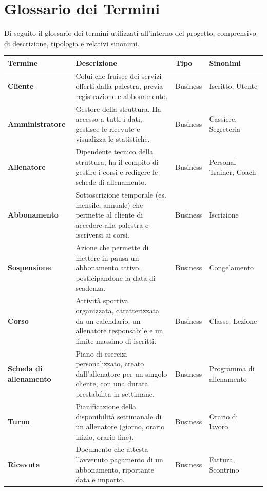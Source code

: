\documentclass[12pt,a4paper]{report}
\begin{document}
\chapter{Glossario dei Termini}
\label{ch:glossario}

Di seguito il glossario dei termini utilizzati all'interno del progetto, comprensivo di descrizione, tipologia e relativi sinonimi.

\begin{table}[H]
\centering
\setlength{\tabcolsep}{4pt}
\begin{tabular}{|p{3.8cm}|p{5.3cm}|p{1.8cm}|p{3.2cm}|}
\hline
Termine & Descrizione & Tipo & Sinonimi \\
\hline
\textbf{Cliente} & Colui che fruisce dei servizi offerti dalla palestra, previa registrazione e abbonamento. & Business & Iscritto, Utente \\
\hline
\textbf{Amministratore} & Gestore della struttura. Ha accesso a tutti i dati, gestisce le ricevute e visualizza le statistiche. & Business & Cassiere, Segreteria \\
\hline
\textbf{Allenatore} & Dipendente tecnico della struttura, ha il compito di gestire i corsi e redigere le schede di allenamento. & Business & Personal Trainer, Coach \\
\hline
\textbf{Abbonamento} & Sottoscrizione temporale (es. mensile, annuale) che permette al cliente di accedere alla palestra e iscriversi ai corsi. & Business & Iscrizione \\
\hline
\textbf{Sospensione} & Azione che permette di mettere in pausa un abbonamento attivo, posticipandone la data di scadenza. & Business & Congelamento \\
\hline
\textbf{Corso} & Attività sportiva organizzata, caratterizzata da un calendario, un allenatore responsabile e un limite massimo di iscritti. & Business & Classe, Lezione \\
\hline
\textbf{Scheda di allenamento} & Piano di esercizi personalizzato, creato dall'allenatore per un singolo cliente, con una durata prestabilita in settimane. & Business & Programma di allenamento \\
\hline
\textbf{Turno} & Pianificazione della disponibilità settimanale di un allenatore (giorno, orario inizio, orario fine). & Business & Orario di lavoro \\
\hline
\textbf{Ricevuta} & Documento che attesta l'avvenuto pagamento di un abbonamento, riportante data e importo. & Business & Fattura, Scontrino \\

\end{tabular}
\end{table}
\end{document}
